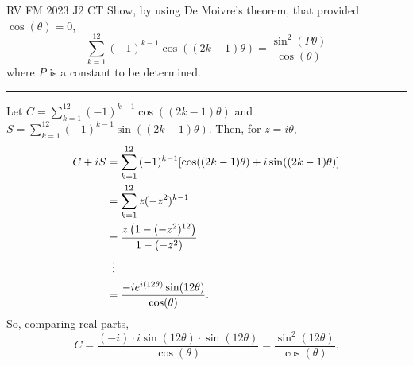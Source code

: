 \documentclass[oneside]{book}
\begin{document}
\begin{example}{RV FM 2023 J2 CT}{}
  Show, by using De Moivre's theorem, that provided \(\cos(\theta)=0\), 
  \[\sum_{k=1}^{12}{(-1)^{k-1}\cos((2k-1)\theta)}=\frac{\sin^2(P\theta)}{\cos(\theta)}\]
  where \(P\) is a constant to be determined.

  \rule{20cm-137.0549pt}{0.05mm}

  Let \(C=\sum_{k=1}^{12}{(-1)^{k-1}\cos((2k-1)\theta)}\) and \(S=\sum_{k=1}^{12}{(-1)^{k-1}\sin((2k-1)\theta)}\). Then, for \(z=i\theta\),
  \begin{align*}
    C+iS &=\sum_{k=1}^{12}{(-1)^{k-1}[\cos((2k-1)\theta)+i\sin((2k-1)\theta)]}\\
    &=\sum_{k=1}^{12}{z(-z^2)^{k-1}}\\
    &=\frac{z\left(1-(-z^2)^{12}\right)}{1-(-z^2)}\\
    &\vdotswithin{=}\\
    &=\frac{-ie^{i(12\theta)}\sin(12\theta)}{\cos(\theta)}.
  \end{align*}
  So, comparing real parts,
  \[C=\frac{(-i)\cdot i\sin(12\theta) \cdot \sin(12\theta)}{\cos(\theta)}=\frac{\sin^2(12\theta)}{\cos(\theta)}.\]
\end{example}
\end{document}

